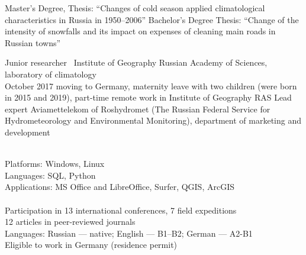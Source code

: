 \documentclass[11pt]{developercv} %
\begin{document}
\begin{entrylist}
  {Master's Degree,}
    {}
    {Thesis: ``Changes of cold season applied climatological characteristics in Russia in 1950--2006''}
    {Bachelor's Degree}
    {}
    { Thesis: ``Change of the intensity of snowfalls and its impact on expenses of cleaning main roads in Russian towns''}
\end{entrylist}



\begin{entrylist}
    {Junior researcher}
    {}
    {\
      Institute of Geography Russian Academy of Sciences, laboratory of climatology\\
      {\footnotesize* October 2017 moving to Germany, maternity leave with two children (were born in 2015 and 2019), part-time remote work in Institute of Geography RAS}
    }
    {Lead expert}
    {}
    { Aviamettelekom of Roshydromet (The Russian Federal Service for Hydrometeorology and Environmental Monitoring), department of marketing and development}
\end{entrylist}


\\
  Platforms: Windows, Linux\\
  Languages: SQL, Python\\
  Applications: MS Office and LibreOffice, Surfer, QGIS, ArcGIS\\\\
\cvsect{Additional information}
Participation in 13 international conferences, 7 field expeditions\\
12 articles in peer-reviewed journals\\
Languages: Russian --- native; English --- B1--B2; German --- A2-B1\\
Eligible to work in Germany (residence permit)

\end{document}
